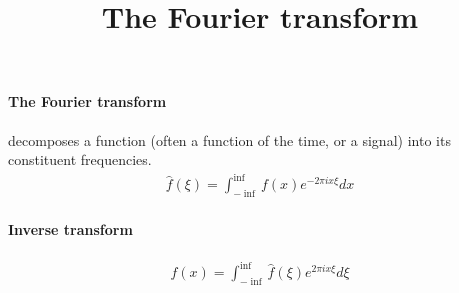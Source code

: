 \documentclass{article}
\title{The Fourier transform}
\begin{document}
\maketitle
\paragraph{The Fourier transform}
decomposes a function (often a function of the time, or a signal) into its constituent frequencies.
\begin{align*}
\hat f(\xi)=\int^{\inf}_{-\inf}f(x)e^{-2\pi ix\xi}_{}dx
\end{align*}
\paragraph{Inverse transform}
\begin{align*}
f(x) = \int^{\inf}_{-\inf}\hat f(\xi)e^{2\pi ix\xi}_{}d\xi
\end{align*}
\end{document}
